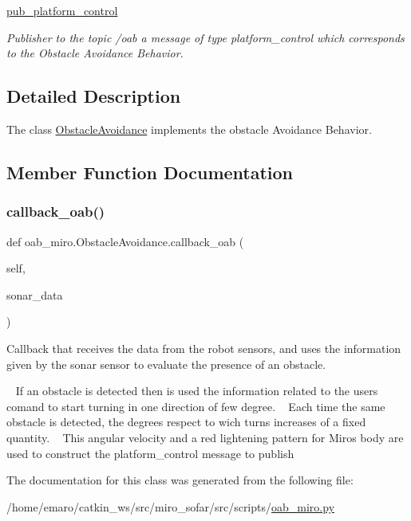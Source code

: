 \begin{DoxyCompactItemize}
\mbox{\label{classoab__miro_1_1ObstacleAvoidance_a1bd2767cd869d8128e963ca793cfb1fc}} 
\mbox{\hyperlink{classoab__miro_1_1ObstacleAvoidance_a1bd2767cd869d8128e963ca793cfb1fc}{pub\+\_\+platform\+\_\+control}}
\begin{DoxyCompactList}\small\item\em Publisher to the topic /oab a message of type platform\+\_\+control which corresponds to the Obstacle Avoidance Behavior. \end{DoxyCompactList}\end{DoxyCompactItemize}


\subsection{Detailed Description}
The class \mbox{\hyperlink{classoab__miro_1_1ObstacleAvoidance}{Obstacle\+Avoidance}} implements the obstacle Avoidance Behavior. 

\subsection{Member Function Documentation}
\mbox{\label{classoab__miro_1_1ObstacleAvoidance_a292e590575d7e28589a60b9c83776fb6}} 
\subsubsection{\texorpdfstring{callback\+\_\+oab()}{callback\_oab()}}
{\footnotesize\ttfamily def oab\+\_\+miro.\+Obstacle\+Avoidance.\+callback\+\_\+oab (\begin{DoxyParamCaption}\item[{}]{self,  }\item[{}]{sonar\+\_\+data }\end{DoxyParamCaption})}



Callback that receives the data from the robot sensors, and uses the information given by the sonar sensor to evaluate the presence of an obstacle. 

~\newline
 If an obstacle is detected then is used the information related to the user\textquotesingle{}s comand to start turning in one direction of few degree. ~\newline
 Each time the same obstacle is detected, the degrees respect to wich turns increases of a fixed quantity. ~\newline
 This angular velocity and a red lightening pattern for Miro\textquotesingle{}s body are used to construct the platform\+\_\+control message to publish 

The documentation for this class was generated from the following file\+:\begin{DoxyCompactItemize}
\item 
/home/emaro/catkin\+\_\+ws/src/miro\+\_\+sofar/src/scripts/\mbox{\hyperlink{oab__miro_8py}{oab\+\_\+miro.\+py}}\end{DoxyCompactItemize}
